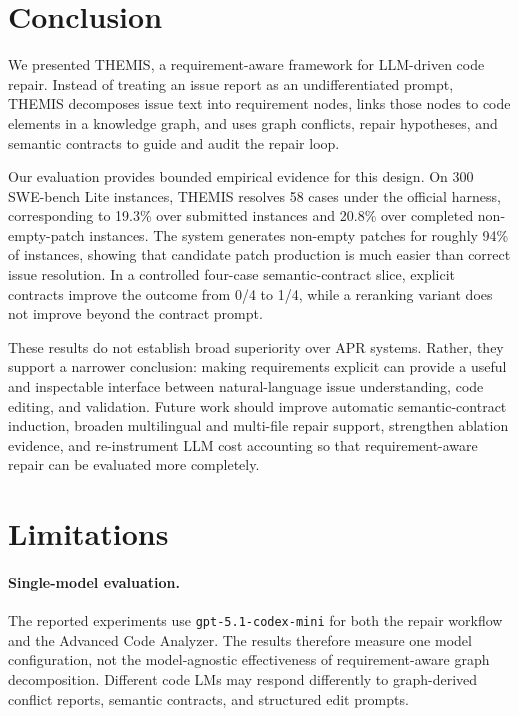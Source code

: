 \documentclass[11pt]{article}
\begin{document}
\section{Conclusion}
\label{sec:conclusion}

We presented THEMIS, a requirement-aware framework for LLM-driven code repair.  Instead of treating an issue report as an undifferentiated prompt, THEMIS decomposes issue text into requirement nodes, links those nodes to code elements in a knowledge graph, and uses graph conflicts, repair hypotheses, and semantic contracts to guide and audit the repair loop.

Our evaluation provides bounded empirical evidence for this design.  On 300 SWE-bench Lite instances, THEMIS resolves 58 cases under the official harness, corresponding to 19.3\% over submitted instances and 20.8\% over completed non-empty-patch instances.  The system generates non-empty patches for roughly 94\% of instances, showing that candidate patch production is much easier than correct issue resolution.  In a controlled four-case semantic-contract slice, explicit contracts improve the outcome from 0/4 to 1/4, while a reranking variant does not improve beyond the contract prompt.

These results do not establish broad superiority over APR systems.  Rather, they support a narrower conclusion: making requirements explicit can provide a useful and inspectable interface between natural-language issue understanding, code editing, and validation.  Future work should improve automatic semantic-contract induction, broaden multilingual and multi-file repair support, strengthen ablation evidence, and re-instrument LLM cost accounting so that requirement-aware repair can be evaluated more completely.

\section{Limitations}
\label{sec:limitations}

\paragraph{Single-model evaluation.}
The reported experiments use \texttt{gpt-5.1-codex-mini} for both the repair workflow and the Advanced Code Analyzer.  The results therefore measure one model configuration, not the model-agnostic effectiveness of requirement-aware graph decomposition.  Different code LMs may respond differently to graph-derived conflict reports, semantic contracts, and structured edit prompts.
\end{document}
